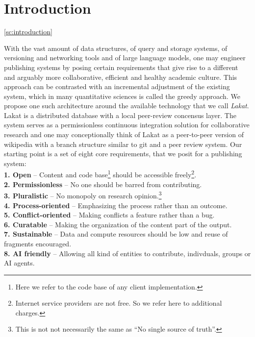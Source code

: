 
\section{Introduction}
\ref{sc:introduction}

With the vast amount of data structures, of query and storage systems, of versioning and networking tools and of large language models, one may engineer publishing systems by posing certain requirements that give rise to a different and arguably more collaborative, efficient and healthy academic culture. This approach can be contrasted with an incremental adjustment of the existing system, which in many quantitative sciences is called the greedy approach. We propose one such architecture around the available technology that we call \textit{Lakat}.
Lakat is a distributed database with a local peer-review concensus layer. The system serves as a permissionless continuous integration solution for collaborative research and one may conceptionally think of Lakat as a peer-to-peer  version of wikipedia with a branch structure similar to git and a peer review system.
Our starting point is a set of eight core requirements, that we posit for a publishing system:\\

\indent \textbf{1. Open} -- 
 Content and code base\footnote{Here we refer to the code base of any client implementation.} should be accessible freely\footnote{Internet service providers are not free. So we refer here to additional charges.}.\\
\indent\textbf{2. Permissionless} --
 No one should be barred from contributing.\\
\indent\textbf{3. Pluralistic} -- No monopoly on research opinion.\footnote{This is not not necessarily the same as ``No single source of truth''.}\\
\indent\textbf{4. Process-oriented} -- Emphasizing the process rather than an outcome.\\
\indent\textbf{5. Conflict-oriented} -- Making conflicts a feature rather than a bug.\\
\indent\textbf{6. Curatable} -- Making the organization of the content part of the output.\\
\indent\textbf{7. Sustainable} -- 
 Data and compute resources should be low and reuse of fragments encouraged.\\
\indent\textbf{8. AI friendly} -- Allowing all kind of entities to contribute, indivduals, groups or AI agents.\\

